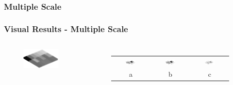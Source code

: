 \documentclass[9pt]{beamer}
\begin{document}
\subsubsection{Multiple Scale}
\begin{frame}[shrink]
\frametitle{Visual Results - Multiple Scale}
\begin{columns}
\vspace{-2cm}
\begin{figure}
\includegraphics[width=0.9\textwidth]{multi.eps}
\end{figure}
\begin{figure}
\begin{tabular}{c c c }
\includegraphics[width=0.30\textwidth]{canny2dmulti}&\includegraphics[width=0.30\textwidth]{Cannysigma3}&\includegraphics[width=0.30\textwidth]{SteerableFilterSigma2}\\
a & b & c \\

\end{tabular}
\end{figure}
\end{columns}
\end{frame}
\end{document}
